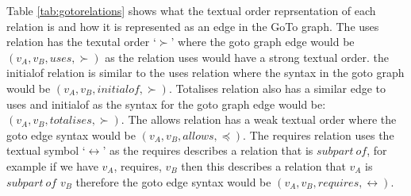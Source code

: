 Table \ref{tab:gotorelations} shows what the textual order reprsentation of each
relation is and how it is represented as an edge in the GoTo graph. The uses
relation has the texutal order `$\succ$' where the goto graph edge would be
$(v_{A}, v_{B}, uses, \succ)$ as the relation uses would have a strong textual
order. the initialof relation is similar to the uses relation where the syntax
in the goto graph would be $(v_{A}, v_{B}, initialof, \succ)$. Totalises
relation also has a similar edge to uses and initialof as the syntax for the
goto graph edge would be: $(v_{A}, v_{B}, totalises, \succ)$. The allows
relation has a weak textual order where the goto edge syntax would be $(v_{A},
v_{B}, allows, \preceq)$. The requires relation uses the textual symbol
`$\leftrightarrow$' as the requires describes a relation that is $subpart\ of$,
for example if we have $v_{A}$, requires, $v_{B}$ then this describes a relation
that $v_{A}$ is $subpart\ of$ $v_{B}$ therefore the goto edge syntax would be
$(v_{A}, v_{B}, requires, \leftrightarrow)$.

